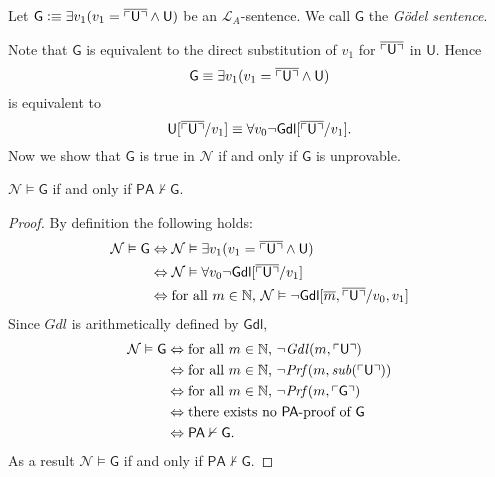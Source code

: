 \begin{dfn}
Let $\mathsf{G} \vcentcolon \equiv \exists v_1 (v_1 = \overline{\ulcorner \mathsf{U} \urcorner} \wedge\mathsf{ U})$ be an $\mathcal{L}_A$-sentence. We call $\mathsf{G}$ the \textit{G\"odel sentence}.
\end{dfn}
Note that $\mathsf{G}$ is equivalent to the direct substitution of $v_1$ for $\overline{\ulcorner \mathsf{U} \urcorner}$ in $\mathsf{U}$. Hence
\[
\mathsf{G}   \equiv \exists v_1 (v_1 = \overline{\ulcorner \mathsf{U} \urcorner} \wedge\mathsf{ U})
\]
is equivalent to
\[
 \mathsf{U}[\overline{\ulcorner \mathsf{U} \urcorner}/ v_1] \equiv \forall v_0  \lnot \mathsf{Gdl}[\overline{\ulcorner \mathsf{U} \urcorner }/v_1 ].
\]
Now we show that $\mathsf{G}$ is true in $\mathcal{N}$ if and only if $\mathsf{G}$ is unprovable.
\begin{thm}\label{thm:Gtrueunprovable}
$\mathcal{N} \vDash \mathsf{G}$ if and only if $\mathsf{PA} \nvdash \mathsf{G}$.
\end{thm}

\begin{proof}
By definition the following holds:
\begin{align*}
\mathcal{N} \vDash \mathsf{G} &\Leftrightarrow \mathcal{N} \vDash  \exists v_1 (v_1 = \overline{\ulcorner \mathsf{U} \urcorner} \wedge\mathsf{ U})  \\
& \Leftrightarrow \mathcal{N} \vDash \forall v_0  \lnot \mathsf{Gdl}[\overline{\ulcorner \mathsf{U} \urcorner }/v_1 ] \\
& \Leftrightarrow \text{for all }m \in \mathbb{N}\text{, }\mathcal{N} \vDash \lnot\mathsf{Gdl}[\overline{m},\overline{\ulcorner \mathsf{U} \urcorner }/v_0, v_1 ]
\end{align*}
Since $\mathit{Gdl}$ is arithmetically defined by $\mathsf{Gdl}$,
\begin{align*}
\mathcal{N} \vDash \mathsf{G} &  \Leftrightarrow \text{for all }m \in \mathbb{N}\text{, } \lnot \mathit{Gdl}(m, \ulcorner \mathsf{U} \urcorner ) \\
& \Leftrightarrow \text{for all }m \in \mathbb{N}\text{, } \lnot \mathit{Prf}(m, \mathit{sub}(\ulcorner \mathsf{U} \urcorner)) \\
& \Leftrightarrow \text{for all }m \in \mathbb{N}\text{, } \lnot \mathit{Prf}(m, \ulcorner \mathsf{G} \urcorner) \\
& \Leftrightarrow \text{there exists no }\mathsf{PA}\text{-proof of }\mathsf{G} \\
& \Leftrightarrow\mathsf{PA} \nvdash \mathsf{G}.
\end{align*}
As a result $\mathcal{N} \vDash \mathsf{G}$ if and only if $\mathsf{PA} \nvdash \mathsf{G}$. 
\end{proof}

